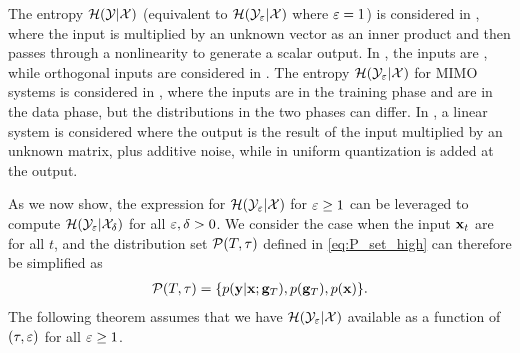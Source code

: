 \documentclass[12pt, draftclsnofoot,journal,onecolumn]{IEEEtran}
\begin{document}
The entropy $\mathcal{H}(\mathcal{Y}|\mathcal{X})$ (equivalent to $\mathcal{H}(\mathcal{Y}_\varepsilon|\mathcal{X})$ where $\varepsilon=1$) is considered in \cite{engel2001statistical,opper1996statistical,ha1993generalization,shinzato2008learning}, where the input is multiplied by an unknown vector as an inner product and then passes through a nonlinearity to generate a scalar output. In \cite{engel2001statistical,opper1996statistical,ha1993generalization}, the inputs are \iid, while orthogonal inputs are considered in \cite{shinzato2008learning}. 
The entropy $\mathcal{H}(\mathcal{Y}_{\varepsilon}|\mathcal{X})$ for MIMO systems is considered in \cite{wen2015performance,wen2015joint,wen2016bayes}, where the inputs are \iid in the training phase and are \iid in the data phase, but the distributions in the two phases can differ. In \cite{wen2015performance}, a linear system is considered where the output is the result of the input multiplied by an unknown matrix, plus additive noise, while in \cite{wen2015joint,wen2016bayes} uniform quantization is added at the output.


As we now show, the expression for $\mathcal{H}(\mathcal{Y}_{\varepsilon}|\mathcal{X})$ for $\varepsilon\geq 1$ can be leveraged to compute $\mathcal{H}(\mathcal{Y}_\varepsilon|\mathcal{X}_\delta)$ for all $\varepsilon,\delta>0$.  We consider the case when the input ${\mathbf{x}}_t$ are \iid for all $t$, and the distribution set $\mathcal{P}(T,\tau)$ defined in \eqref{eq:P_set_high} can therefore be simplified as
\begin{align}
    \mathcal{P}(T,\tau)=\{p({\mathbf{y}}|{\mathbf{x}};{\mathbf{g}}_{T}),p({\mathbf{g}}_{T}),p({\mathbf{x}})\}.
    \label{eq:P_set_high_iid_input}
\end{align}
The following theorem assumes that we have $\mathcal{H}(\mathcal{Y}_\varepsilon|\mathcal{X})$ available as a function of $(\tau,\varepsilon)$ for all $\varepsilon\geq 1$.
\end{document}
